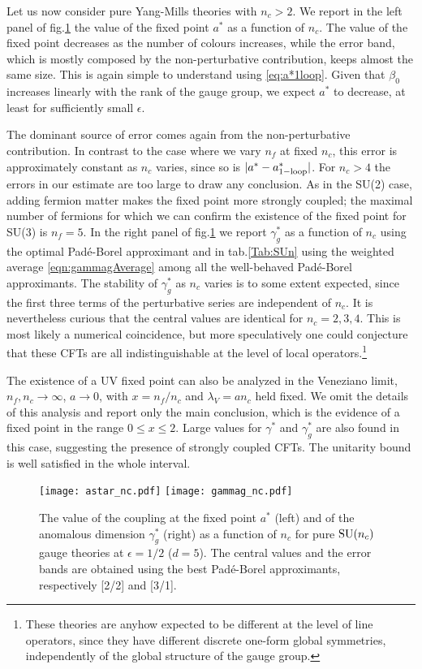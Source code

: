 \documentclass [11pt]{article}
\begin{document}
Let us now consider pure Yang-Mills theories with $n_c>2$. We report in the left panel of fig.\ref{fig:sun_c} the value of the fixed point $a^*$ as a function of $n_c$. The value of the fixed point decreases as the number of colours increases, while the error band, which is mostly composed by the non-perturbative contribution, keeps almost the same size. This is again simple to understand using \eqref{eq:a*1loop}.
Given that $\beta_0$ increases linearly with the rank of the gauge group, we expect $a^*$ to decrease, at least for sufficiently small $\epsilon$. 

The dominant source of error comes again from the non-perturbative contribution. In contrast to the case where we vary $n_f$ at fixed $n_c$, 
this error is approximately constant as $n_c$ varies, since so is $|a^*-a^*_{{\rm 1-loop}}|$. For $n_c>4$ the errors in our estimate are too large to draw any conclusion. 
  As in the  SU(2) case, adding fermion matter makes the fixed point more strongly coupled; the maximal number of fermions for which we can confirm the existence of the fixed point for SU(3) is $n_f=5$.
In the right panel of fig.\ref{fig:sun_c} we report  $\gamma_g^*$ as a function of $n_c$ using the optimal Pad\'e-Borel approximant and in tab.\ref{Tab:SUn} 
using the weighted average \eqref{eqn:gammagAverage} among all the well-behaved Pad\'e-Borel approximants.
The stability of $\gamma_g^*$ as $n_c$ varies is to some extent expected, since the first three terms of the perturbative series are independent of $n_c$. It is 
 nevertheless curious that the central values are identical for $n_c=2,3,4$.
This is most likely a numerical coincidence, but more speculatively one could conjecture that these CFTs are all indistinguishable at the level of local operators.\footnote{These theories are anyhow expected to be different at the level of line operators, since they have different discrete one-form global symmetries, independently of the global structure of the gauge group.}
 
The existence of a UV fixed point can also be analyzed in the Veneziano limit,  $n_f,n_c\rightarrow \infty$, $a\rightarrow 0$,  with $x=n_f/n_c$ and $\lambda_V=an_c$ held fixed. 
We omit the details of this analysis and report only the main conclusion, which 
is the evidence of a fixed point in the range $0\leq x \leq 2$. Large values for $\gamma^*$ and $\gamma_g^*$ are also found in this case, suggesting the presence of strongly coupled CFTs. The unitarity bound is well satisfied in the whole interval.
 \begin{figure} [t!]
 \centering
  \texttt{[image: astar\_nc.pdf]} 
 \hspace*{4pt}
 \texttt{[image: gammag\_nc.pdf]}  
\caption{The value of the coupling at the fixed point $a^*$ (left) and of the anomalous dimension $\gamma_g^*$ (right) as a function of $n_c$ for pure ${\rm SU}(n_c)$ gauge theories  at $\epsilon=1/2$ ($d=5$). The central values and the error bands are obtained using the best Pad\'e-Borel approximants, respectively  [2/2] and [3/1].  } 
\label{fig:sun_c}
\end{figure}
\end{document}
